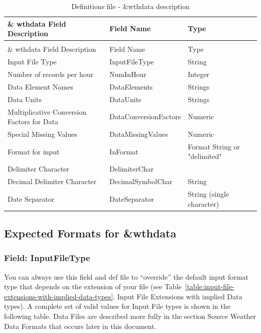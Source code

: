 \begin{longtable}[c]{p{2.71in}p{1.5in}p{1.79in}}
\caption{Definitions file - \&wthdata description \label{table:definitions-file-wthdata-description}} \tabularnewline
\toprule 
\& wthdata Field Description & Field Name & Type \tabularnewline \midrule
\endfirsthead

\caption[]{Definitions file - \&wthdata description} \tabularnewline
\toprule 
\& wthdata Field Description & Field Name & Type \tabularnewline \midrule
\endhead

Input File Type & InputFileType & String \tabularnewline
Number of records per hour & NumInHour & Integer \tabularnewline
Data Element Names & DataElements & Strings \tabularnewline
Data Units & DataUnits & Strings \tabularnewline
Multiplicative Conversion Factors for Data & DataConversionFactors & Numeric \tabularnewline
Special Missing Values & DataMissingValues & Numeric \tabularnewline
Format for input & InFormat & Format String or "delimited" \tabularnewline
Delimiter Character & DelimiterChar &  \tabularnewline
Decimal Delimiter Character & DecimalSymbolChar & String \tabularnewline
Date Separator & DateSeparator & String (single character) \tabularnewline
\bottomrule
\end{longtable}

\subsection{Expected Formats for \&wthdata}\label{expected-formats-for-wthdata}

\subsubsection{Field: InputFileType}\label{field-inputfiletype}

You can always use this field and def file to ``override'' the default input format type that depends on the extension of your file (see Table~\ref{table:input-file-extensions-with-implied-data-types}. Input File Extensions with implied Data types). A complete set of valid values for Input File types is shown in the following table. Data Files are described more fully in the section Source Weather Data Formats that occurs later in this document.

